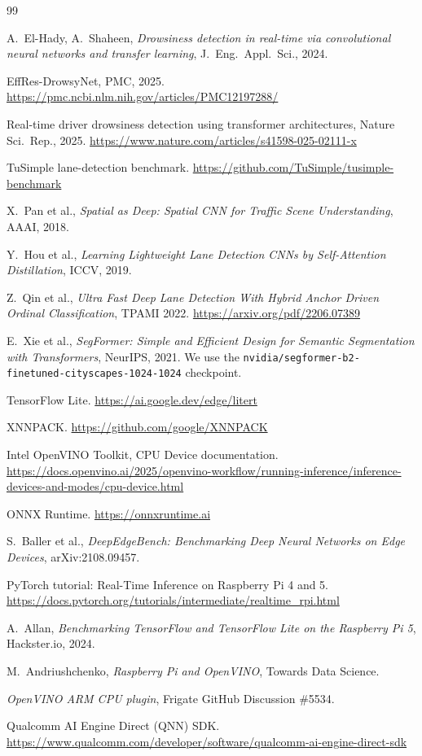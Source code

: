\documentclass[conference]{IEEEtran}
\begin{document}
\begin{thebibliography}{99}

A.\ El-Hady, A.\ Shaheen, \emph{Drowsiness detection in real-time via
convolutional neural networks and transfer learning},
J.\ Eng.\ Appl.\ Sci., 2024.

EffRes-DrowsyNet, PMC, 2025.
\url{https://pmc.ncbi.nlm.nih.gov/articles/PMC12197288/}

Real-time driver drowsiness detection using transformer architectures,
Nature Sci.\ Rep., 2025.
\url{https://www.nature.com/articles/s41598-025-02111-x}

TuSimple lane-detection benchmark.
\url{https://github.com/TuSimple/tusimple-benchmark}

X.\ Pan et al., \emph{Spatial as Deep: Spatial CNN for Traffic Scene
Understanding}, AAAI, 2018.

Y.\ Hou et al., \emph{Learning Lightweight Lane Detection CNNs by
Self-Attention Distillation}, ICCV, 2019.

Z.\ Qin et al., \emph{Ultra Fast Deep Lane Detection With Hybrid
Anchor Driven Ordinal Classification}, TPAMI 2022.
\url{https://arxiv.org/pdf/2206.07389}

E.\ Xie et al., \emph{SegFormer: Simple and Efficient Design for
Semantic Segmentation with Transformers}, NeurIPS, 2021.
We use the \texttt{nvidia/segformer-b2-finetuned-cityscapes-1024-1024}
checkpoint.

TensorFlow Lite. \url{https://ai.google.dev/edge/litert}

XNNPACK. \url{https://github.com/google/XNNPACK}

Intel OpenVINO Toolkit, CPU Device documentation.
\url{https://docs.openvino.ai/2025/openvino-workflow/running-inference/inference-devices-and-modes/cpu-device.html}

ONNX Runtime. \url{https://onnxruntime.ai}

S.\ Baller et al., \emph{DeepEdgeBench: Benchmarking Deep Neural
Networks on Edge Devices}, arXiv:2108.09457.

PyTorch tutorial: Real-Time Inference on Raspberry Pi 4 and 5.
\url{https://docs.pytorch.org/tutorials/intermediate/realtime_rpi.html}

A.\ Allan, \emph{Benchmarking TensorFlow and TensorFlow Lite on the
Raspberry Pi 5}, Hackster.io, 2024.

M.\ Andriushchenko, \emph{Raspberry Pi and OpenVINO}, Towards Data
Science.

\emph{OpenVINO ARM CPU plugin}, Frigate GitHub Discussion \#5534.

Qualcomm AI Engine Direct (QNN) SDK.
\url{https://www.qualcomm.com/developer/software/qualcomm-ai-engine-direct-sdk}

\end{thebibliography}
\end{document}
